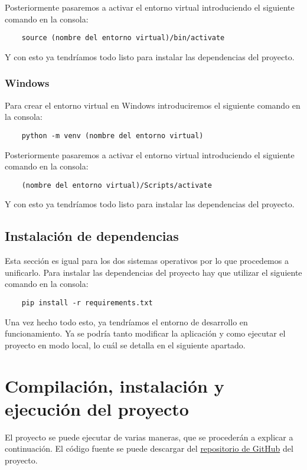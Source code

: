 Posteriormente pasaremos a activar el entorno virtual introduciendo el siguiente comando en la consola:
\begin{verbatim}
    source (nombre del entorno virtual)/bin/activate
\end{verbatim}

Y con esto ya tendríamos todo listo para instalar las dependencias del proyecto.

\subsubsection{Windows}
Para crear el entorno virtual en Windows introduciremos el siguiente comando en la consola:
\begin{verbatim}
    python -m venv (nombre del entorno virtual)
\end{verbatim}

Posteriormente pasaremos a activar el entorno virtual introduciendo el siguiente comando en la consola:
\begin{verbatim}
    (nombre del entorno virtual)/Scripts/activate
\end{verbatim}

Y con esto ya tendríamos todo listo para instalar las dependencias del proyecto.

\subsection{Instalación de dependencias}
Esta sección es igual para los dos sistemas operativos por lo que procedemos a unificarlo. Para instalar las dependencias del proyecto hay que utilizar el siguiente comando en la consola:
\begin{verbatim}
    pip install -r requirements.txt
\end{verbatim}

Una vez hecho todo esto, ya tendríamos el entorno de desarrollo en funcionamiento. Ya se podría tanto modificar la aplicación y como ejecutar el proyecto en modo local, lo cuál se detalla en el siguiente apartado.

\label{sec:compilacion}
\section{Compilación, instalación y ejecución del proyecto}
El proyecto se puede ejecutar de varias maneras, que se procederán  a explicar a continuación. El código fuente se puede descargar del \href{https://github.com/dmp1002/TFG}{repositorio de GitHub} del proyecto. 

